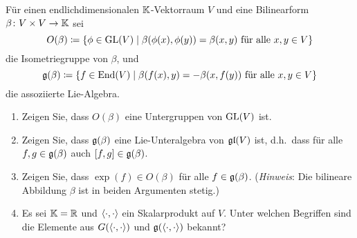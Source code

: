 \documentclass[a4paper,10pt]{scrartcl}
\begin{document}
\begin{question}
  Für einen endlichdimensionalen $\mathbb{K}$-Vektorraum $V$ und eine Bilinearform $\beta \colon V \times V \to \mathbb{K}$ sei
  \[
              O(\beta)
    \coloneqq \{ \phi \in \operatorname{GL}(V) \mid \text{$\beta(\phi(x), \phi(y)) = \beta(x,y)$ für alle $x,y \in V$} \}
  \]
  die Isometriegruppe von $\beta$, und
  \[
              \mathfrak{g}(\beta)
    \coloneqq \{ f \in \operatorname{End}(V) \mid \text{$\beta(f(x),y) = -\beta(x, f(y))$ für alle $x, y \in V$} \}
  \]
  die assoziierte Lie-Algebra.
  \begin{enumerate}[leftmargin=*]
    \item
      Zeigen Sie, dass $O(\beta)$ eine Untergruppen von $\operatorname{GL}(V)$ ist.
    \item
      Zeigen Sie, dass $\mathfrak{g}(\beta)$ eine Lie-Unteralgebra von $\mathfrak{gl}(V)$ ist, d.h.\ dass für alle $f, g \in \mathfrak{g}(\beta)$ auch $[f,g] \in \mathfrak{g}(\beta)$.
    \item
      Zeigen Sie, dass $\exp(f) \in O(\beta)$ für alle $f \in \mathfrak{g}(\beta)$.
      (\emph{Hinweis}: Die bilineare Abbildung $\beta$ ist in beiden Argumenten stetig.)
    \item
      Es sei $\mathbb{K} = \mathbb{R}$ und $\langle \cdot, \cdot \rangle$ ein Skalarprodukt auf $V$.
      Unter welchen Begriffen sind die Elemente aus $G(\langle \cdot, \cdot \rangle)$ und $\mathfrak{g}(\langle \cdot, \cdot \rangle)$ bekannt?
  \end{enumerate}
\end{question}
\end{document}
